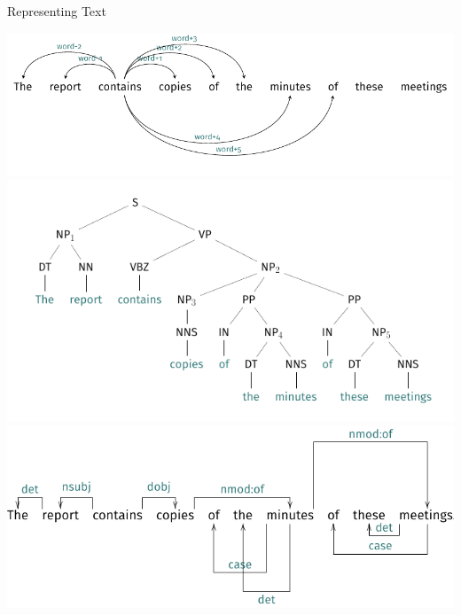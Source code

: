 \documentclass[10pt,=table]{beamer}
\begin{document}
\begin{frame}{Representing Text}
\begin{overprint}
	  \vfill
	  \centering	  
      \includegraphics[width=.8\linewidth]{img/tree/lexical_tree.pdf}
	  \vfill
	  \vfill
  	  \centering
      \includegraphics[width=.8\linewidth]{img/tree/tree.pdf}
      \vfill
	  \vfill
	  \centering
      \includegraphics[width=.8\linewidth]{img/tree/dep_tree.pdf}
      \vfill
\end{overprint}
\end{frame}
\end{document}
